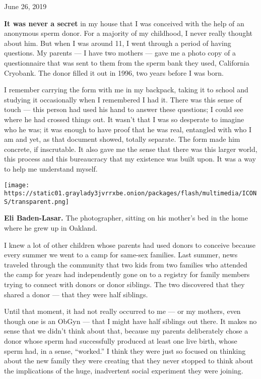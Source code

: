 June 26, 2019

\textbf{It was never a secret} in my house that I was conceived with the
help of an anonymous sperm donor. For a majority of my childhood, I
never really thought about him. But when I was around 11, I went through
a period of having questions. My parents --- I have two mothers --- gave
me a photo copy of a questionnaire that was sent to them from the sperm
bank they used, California Cryobank. The donor filled it out in 1996,
two years before I was born.

I remember carrying the form with me in my backpack, taking it to school
and studying it occasionally when I remembered I had it. There was this
sense of touch --- this person had used his hand to answer these
questions; I could see where he had crossed things out. It wasn't that I
was so desperate to imagine who he was; it was enough to have proof that
he was real, entangled with who I am and yet, as that document showed,
totally separate. The form made him concrete, if inscrutable. It also
gave me the sense that there was this larger world, this process and
this bureaucracy that my existence was built upon. It was a way to help
me understand myself.

\texttt{[image: https://static01.graylady3jvrrxbe.onion/packages/flash/multimedia/ICONS/transparent.png]}

\textbf{Eli Baden-Lasar.} The photographer, sitting on his mother's bed
in the home where he grew up in Oakland.

I knew a lot of other children whose parents had used donors to conceive
because every summer we went to a camp for same-sex families. Last
summer, news traveled through the community that two kids from two
families who attended the camp for years had independently gone on to a
registry for family members trying to connect with donors or donor
siblings. The two discovered that they shared a donor --- that they were
half siblings.

Until that moment, it had not really occurred to me --- or my mothers,
even though one is an ObGyn --- that I might have half siblings out
there. It makes no sense that we didn't think about that, because my
parents deliberately chose a donor whose sperm had successfully produced
at least one live birth, whose sperm had, in a sense, ``worked.'' I
think they were just so focused on thinking about the new family they
were creating that they never stopped to think about the implications of
the huge, inadvertent social experiment they were joining.


